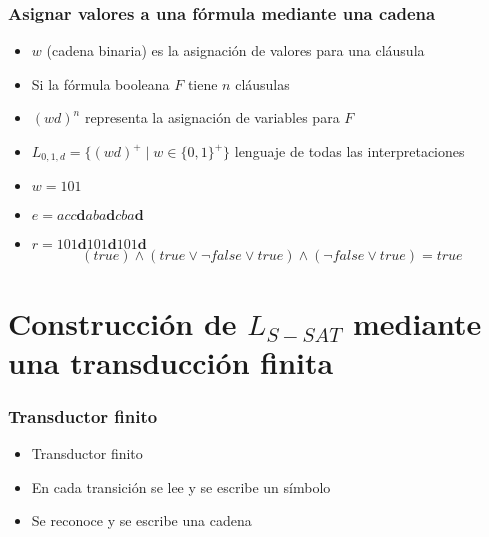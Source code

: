 \documentclass{beamer}
\begin{document}
\begin{frame}
    \frametitle{Asignar valores a una fórmula mediante una cadena}
    
    \begin{itemize}
        \item<1->$w$ (cadena binaria) es la asignación de valores para una cláusula
        \item<2-> Si la fórmula booleana $F$ tiene $n$ cláusulas
        \item<3-> $(wd)^n$ representa la asignación de variables para $F$
        \item<4-> $L_{0,1,d}=\{(wd)^+\mid w\in\{0,1\}^+\}$ lenguaje de todas las interpretaciones
            \vspace{0.5cm}
        \item<1-> $w=101$
        \item<2-> $e= acc\mathbf{d}aba\mathbf{d}cba\mathbf{d}$
        \item<3-> $r=101\mathbf{d}101\mathbf{d}101\mathbf{d}$
            $$(true)\wedge(true\vee \neg false \vee true) \wedge (\neg false\vee true)=true$$
            
    \end{itemize}
\end{frame}

\section{Construcción de $L_{S-SAT}$ mediante una transducción finita}

\begin{frame}
    \frametitle{Transductor finito}
    
    \begin{itemize}
        \item<1-> Transductor finito
        \item<2-> En cada transición se lee y se escribe un símbolo
        \item<3-> Se reconoce y se escribe una cadena
    \end{itemize}
\end{frame}
\end{document}
